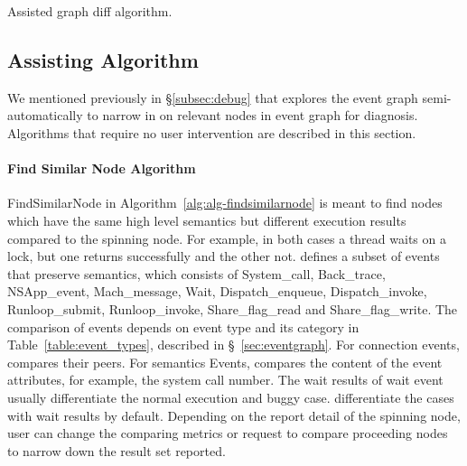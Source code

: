 \begin{algorithm}[ht!]
    \caption{\xxx Assisted graph diff algorithm.}
    \label{alg:alg-graphdiff}
\begin{algorithmic}[1]
\Statex
{}
	\EndIf
	\EndIf
\EndFor
{}
\EndFunction
\end{algorithmic}
\end{algorithm}


\subsection{\xxx Assisting Algorithm}

We mentioned previously in \S\ref{subsec:debug} that \xxx explores the event
graph semi-automatically to narrow in on relevant nodes in event graph for
diagnosis. Algorithms that require no user intervention are described
in this section.

\paragraph{Find Similar Node Algorithm}

FindSimilarNode in Algorithm~\ref{alg:alg-findsimilarnode} is meant to find
nodes which have the same high level semantics but different execution
results compared to the spinning node. For example, in both cases a thread
waits on a lock, but one returns successfully and the other not. \xxx
defines a subset of events that preserve semantics, which consists of
System\_call, Back\_trace, NSApp\_event, Mach\_message, Wait, Dispatch\_enqueue,
Dispatch\_invoke, Runloop\_submit, Runloop\_invoke, Share\_flag\_read and
Share\_flag\_write. The comparison of events depends on event type and its
category in Table~\ref{table:event_types}, described in \S~\ref{sec:eventgraph}.
For connection events, \xxx compares their peers. For semantics Events, \xxx
compares the content of the event attributes, for example, the system call
number. The wait results of wait event usually differentiate the normal
execution and buggy case. \xxx differentiate the cases with wait results by
default. Depending on the report detail of the spinning node, user can change
the comparing metrics or request \xxx to compare proceeding nodes to narrow down
the result set reported.

